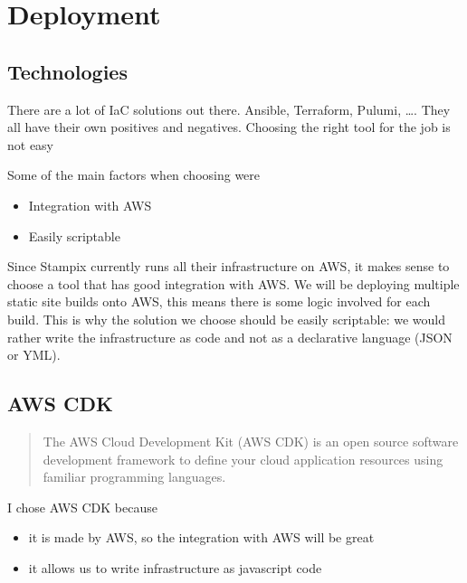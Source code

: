 
\chapter{Deployment} %

\label{Chapter5} 

\section{Technologies}

There are a lot of IaC solutions out there. Ansible, Terraform, Pulumi, \ldots. 
They all have their own positives and negatives. Choosing the right tool for the job is not easy

Some of the main factors when choosing were

\begin{itemize}
	\item Integration with AWS
	\item Easily scriptable
\end{itemize}

Since Stampix currently runs all their infrastructure on AWS, it makes sense to choose a tool that has good integration with AWS. 
We will be deploying multiple static site builds onto AWS, this means there is some logic involved for each build.
This is why the solution we choose should be easily scriptable: we would rather write the infrastructure as code and not as a declarative language (JSON or YML).




\section{AWS CDK}

\begin{quote}
	The AWS Cloud Development Kit (AWS CDK) is an open source software development framework to define your cloud application resources using familiar programming languages.
	\hfill \cite{awscdk}
\end{quote}

I chose AWS CDK because 

\begin{itemize}
	\item it is made by AWS, so the integration with AWS will be great
	\item it allows us to write infrastructure as javascript code
\end{itemize}

